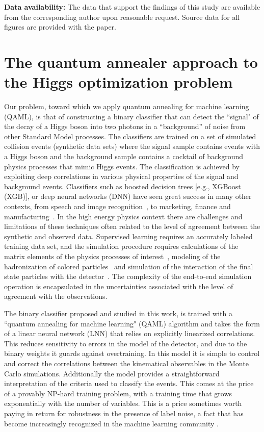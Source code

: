 \documentclass[.chapters/Higgs/.chapters/Higgs/main.tex]{subfiles}
\begin{document}
\textbf{Data availability:} The data that support the findings of this study are available from the corresponding
author upon reasonable request. Source data for all figures are provided with the paper.

 
\section*{The quantum annealer approach to the Higgs optimization problem}

Our problem, toward which we apply quantum annealing for machine learning (QAML), is that of constructing a binary classifier that can detect the ``signal" of the decay of a Higgs boson into two photons in a ``background'' of noise from other Standard Model processes. The classifiers are trained on a set of simulated collision events 
 (synthetic data sets) where the signal sample contains events with a Higgs boson and the background sample 
 contains a cocktail of background physics processes that mimic Higgs events. The classification is  achieved 
 by exploiting deep correlations in various physical properties of the signal and background events.   
 Classifiers such as boosted decision trees [e.g.,  XGBoost (XGB)], or deep neural networks (DNN) have seen great 
 success in many other contexts, from speech and image recognition~\cite{Le:2013}, to marketing, finance and 
 manufacturing~\cite{BigDataMarketing:2015}. In the high energy physics context there are challenges and limitations 
 of these  techniques often related to the level of agreement between the synthetic and observed data. Supervised 
 learning requires an accurately labeled training data set, and the simulation procedure requires calculations of the 
 matrix elements of the physics processes of interest~\cite{Alwall:2014hca}, modeling of the hadronization of colored 
 particles~\cite{Sjostrand:2006za} and simulation of the interaction of the final state particles with the detector~\cite{Agostinelli:2002hh}.  
The complexity of the end-to-end simulation operation is encapsulated in the uncertainties associated with the level of agreement with the observations.

The binary classifier proposed and studied in this work, is trained with a ``quantum annealing for machine learning" (QAML) algorithm \cite{Neven1,Pudenz:2013kx}   and takes  the form of a  linear neural network (LNN) that relies on explicitly linearized  correlations. This  reduces sensitivity to errors in the model of  the detector, and due to the binary weights  it guards against overtraining.  In this model it is simple to control and correct the correlations  between the kinematical observables in the Monte Carlo simulations. Additionally the model provides a straightforward interpretation  of the criteria used to classify the events. This comes at the price of a provably NP-hard training problem, with a training time  that grows exponentially with the number of variables.  This is a price sometimes worth paying in return for robustness in the presence of label noise, a fact that has become increasingly recognized in the machine learning community \cite{Long:2010fj,Manwani:2013qv,ICML2012Denchev_461}. 
\end{document}
